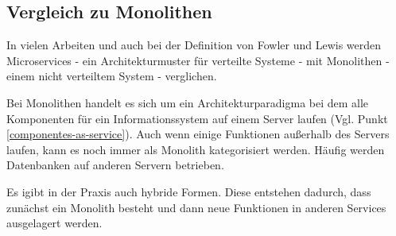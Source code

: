 \subsection{Vergleich zu Monolithen}\label{compare-monolith}

In vielen Arbeiten und auch bei der Definition von Fowler und Lewis werden
Microservices - ein Architekturmuster für verteilte Systeme - mit Monolithen -
einem nicht verteiltem System - verglichen.

Bei Monolithen handelt es sich um ein Architekturparadigma bei dem alle
Komponenten für ein Informationssystem auf einem Server laufen (Vgl. Punkt
\ref{componentes-as-service}). Auch wenn einige Funktionen außerhalb des Servers
laufen, kann es noch immer als Monolith kategorisiert werden. Häufig werden
Datenbanken auf anderen Servern betrieben.

Es igibt in der Praxis auch hybride Formen. Diese entstehen dadurch, dass
zunächst ein Monolith besteht und dann neue Funktionen in anderen Services
ausgelagert werden.

%






